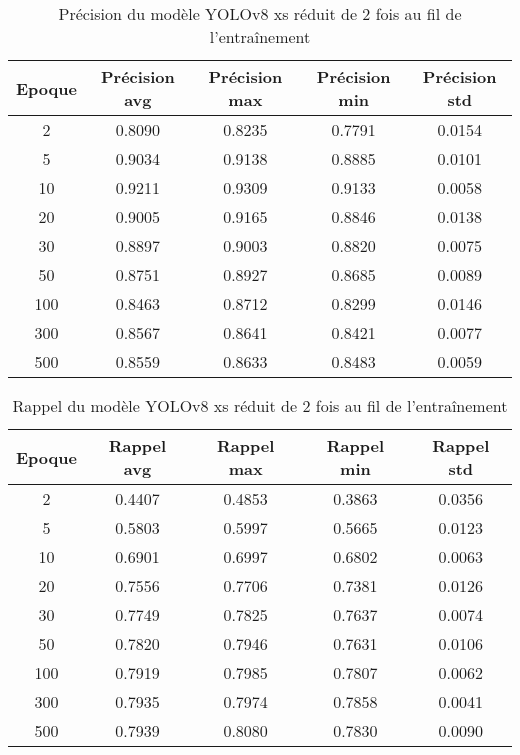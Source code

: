\begin{table}[!ht]
    \caption{Précision du modèle YOLOv8 xs réduit de 2 fois au fil de l'entraînement}
    \label{tab:yolov8xs_reduced2x_precision}
    \centering
    \begin{tabular}{ |c||c|c|c|c|  }
        \hline
        \rowcolor{gray!50}
        Epoque & Précision avg & Précision max & Précision min & Précision std\\
        \hline
        2 & 0.8090 & 0.8235 & 0.7791 & 0.0154\\
        5 & 0.9034 & 0.9138 & 0.8885 & 0.0101\\
        10 & 0.9211 & 0.9309 & 0.9133 & 0.0058\\
        20 & 0.9005 & 0.9165 & 0.8846 & 0.0138\\
        30 & 0.8897 & 0.9003 & 0.8820 & 0.0075\\
        50 & 0.8751 & 0.8927 & 0.8685 & 0.0089\\
        100 & 0.8463 & 0.8712 & 0.8299 & 0.0146\\
        300 & 0.8567 & 0.8641 & 0.8421 & 0.0077\\
        500 & 0.8559 & 0.8633 & 0.8483 & 0.0059\\
        \hline
    \end{tabular}
\end{table}

\begin{table}[!ht]
    \caption{Rappel du modèle YOLOv8 xs réduit de 2 fois au fil de l'entraînement}
    \label{tab:yolov8xs_reduced2x_rappel}
    \centering
    \begin{tabular}{ |c||c|c|c|c|  }
        \hline
        \rowcolor{gray!50}
        Epoque & Rappel avg & Rappel max & Rappel min & Rappel std\\
        \hline
        2 & 0.4407 & 0.4853 & 0.3863 & 0.0356\\
        5 & 0.5803 & 0.5997 & 0.5665 & 0.0123\\
        10 & 0.6901 & 0.6997 & 0.6802 & 0.0063\\
        20 & 0.7556 & 0.7706 & 0.7381 & 0.0126\\
        30 & 0.7749 & 0.7825 & 0.7637 & 0.0074\\
        50 & 0.7820 & 0.7946 & 0.7631 & 0.0106\\
        100 & 0.7919 & 0.7985 & 0.7807 & 0.0062\\
        300 & 0.7935 & 0.7974 & 0.7858 & 0.0041\\
        500 & 0.7939 & 0.8080 & 0.7830 & 0.0090\\
        \hline
    \end{tabular}
\end{table}

